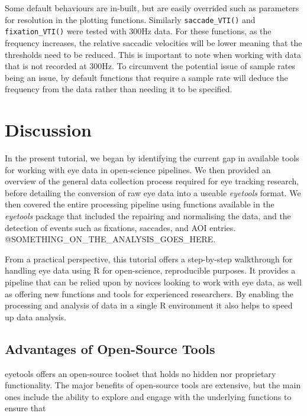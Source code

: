\documentclass[
  man,
  floatsintext,
  longtable,
  nolmodern,
  notxfonts,
  notimes,
  colorlinks=true,linkcolor=blue,citecolor=blue,urlcolor=blue]{apa7}
\begin{document}
Some default behaviours are in-built, but are easily overrided such as
parameters for resolution in the plotting functions. Similarly
\texttt{saccade\_VTI()} and \texttt{fixation\_VTI()} were tested with
300Hz data. For these functions, as the frequency increases, the
relative saccadic velocities will be lower meaning that the thresholds
need to be reduced. This is important to note when working with data
that is not recorded at 300Hz. To circumvent the potential issue of
sample rates being an issue, by default functions that require a sample
rate will deduce the frequency from the data rather than needing it to
be specified.

\section{Discussion}\label{discussion}

In the present tutorial, we began by identifying the current gap in
available tools for working with eye data in open-science pipelines. We
then provided an overview of the general data collection process
required for eye tracking research, before detailing the conversion of
raw eye data into a useable \emph{eyetools} format. We then covered the
entire processing pipeline using functions available in the
\emph{eyetools} package that included the repairing and normalising the
data, and the detection of events such as fixations, saccades, and AOI
entries. @SOMETHING\_ON\_THE\_ANALYSIS\_GOES\_HERE.

From a practical perspective, this tutorial offers a step-by-step
walkthrough for handling eye data using R for open-science, reproducible
purposes. It provides a pipeline that can be relied upon by novices
looking to work with eye data, as well as offering new functions and
tools for experienced researchers. By enabling the processing and
analysis of data in a single R environment it also helps to speed up
data analysis.

\subsection{Advantages of Open-Source
Tools}\label{advantages-of-open-source-tools}

eyetools offers an open-source toolset that holds no hidden nor
proprietary functionality. The major benefits of open-source tools are
extensive, but the main ones include the ability to explore and engage
with the underlying functions to ensure that
\end{document}

